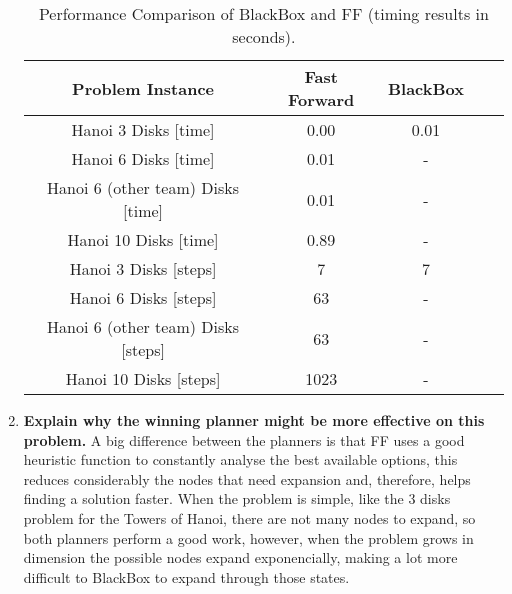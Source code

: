\documentclass[12pt]{article}
\begin{document}
\begin{enumerate}
   \begin{table}%
    \label{table:results1}
    \caption{Performance Comparison of BlackBox and FF (timing results in seconds).}
    \begin{tabular*}{1.0\textwidth}{c|c|c|c|c}
    \hline
    \bfseries Problem Instance & \bfseries Fast Forward & \bfseries BlackBox \\
    \hline\hline
    Hanoi 3 Disks [time] 		&  0.00 	& 0.01	\\ \hline    
    Hanoi 6 Disks [time] 		&  0.01	& -	\\ \hline
    Hanoi 6 (other team) Disks [time] 		&  0.01 	& -	\\ \hline
    Hanoi 10 Disks [time] 	&  0.89  & -	\\ \hline\hline
    Hanoi 3 Disks [steps]		&  7 	& 7 	\\ \hline
    Hanoi 6 Disks [steps]		&  63  	& - 	\\ \hline
    Hanoi 6 (other team) Disks [steps]		&  63 	& - 	\\ \hline
    Hanoi 10 Disks [steps]	&  1023 	& - 	\\ \hline
    \hline
    \end{tabular*}
    \end{table}

 \item  \textbf{Explain why the winning planner might be more effective on this problem.} \newline
A big difference between the planners is that FF uses a good heuristic function to constantly analyse the best available options, this reduces considerably the nodes that need expansion and, therefore, helps finding a solution faster. When the problem is simple, like the 3 disks problem for the Towers of Hanoi, there are not many nodes to expand, so both planners perform a good work, however, when the problem grows in dimension the possible nodes expand exponencially, making a lot more difficult to BlackBox to expand through those states.
\end{enumerate}
\end{document}
